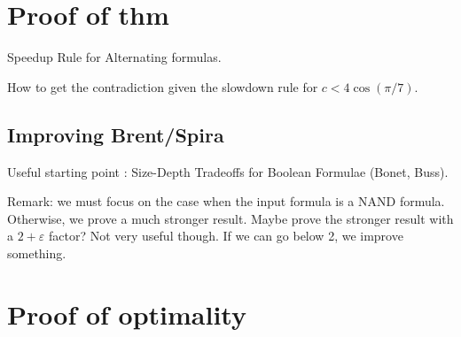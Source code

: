 \documentclass[a4paper, 12pt]{article}
\theoremstyle{plain}
\theoremstyle{definition}
\theoremstyle{remark}
\newcommand{\eps}{\varepsilon}%
\newcommand{\NAND}{\textsf{NAND}}%
\begin{document}
\section{Proof of thm}
Speedup Rule for Alternating formulas.

How to get the contradiction given the slowdown rule for $c < 4\cos(\pi /7)$.

\subsection{Improving Brent/Spira}
Useful starting point : Size-Depth Tradeoffs for Boolean Formulae (Bonet, Buss).

Remark: we must focus on the case when the input formula is a \NAND{} formula.
Otherwise, we prove a much stronger result.
Maybe prove the stronger result with a $2+\eps$ factor? Not very useful though.
If we can go below 2, we improve something.
\section{Proof of optimality}




\end{document}

